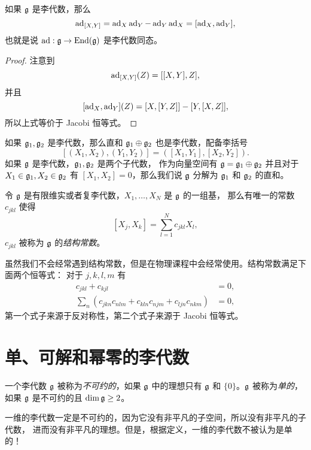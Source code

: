 \begin{proposition}
  如果 $\mathfrak{g}$ 是李代数，那么
  \[
    \operatorname{ad}_{[X,Y]}=\operatorname{ad}_X\operatorname{ad}_Y-\operatorname{ad}_Y\operatorname{ad}_X=[\operatorname{ad}_X,\operatorname{ad}_Y],
  \]
  也就是说 $\operatorname{ad}:\mathfrak{g}\to\operatorname{End}(\mathfrak{g})$ 是李代数同态。
\end{proposition}
\begin{proof}
  注意到
  \[
    \operatorname{ad}_{[X,Y]}(Z)=[[X,Y],Z],
  \]
  并且
  \[
    [\operatorname{ad}_X,\operatorname{ad}_Y](Z)=[X,[Y,Z]]-[Y,[X,Z]],
  \]
  所以上式等价于 Jacobi 恒等式。
\end{proof}

\begin{definition}
  如果 $\mathfrak{g}_1,\mathfrak{g}_2$ 是李代数，那么直和 $\mathfrak{g}_1\oplus\mathfrak{g}_2$
  也是李代数，配备李括号
  \[
    [(X_1,X_2),(Y_1,Y_2)]=([X_1,Y_1],[X_2,Y_2]).
  \]
  如果 $\mathfrak{g}$ 是李代数，$\mathfrak{g}_1,\mathfrak{g}_2$ 是两个子代数，
  作为向量空间有 $\mathfrak{g}=\mathfrak{g}_1\oplus\mathfrak{g}_2$ 并且对于 $X_1\in\mathfrak{g}_1,X_2\in\mathfrak{g}_2$
  有 $[X_1,X_2]=0$，那么我们说 $\mathfrak{g}$ 分解为 $\mathfrak{g}_1$ 和 $\mathfrak{g}_2$
  的直和。
\end{definition}

\begin{definition}
  令 $\mathfrak{g}$ 是有限维实或者复李代数，$X_1,\dots,X_N$ 是 $\mathfrak{g}$ 的一组基，
  那么有唯一的常数 $c_{jkl}$ 使得 
  \[
    [X_j,X_k]=\sum_{l=1}^N c_{jkl}X_l,
  \]
  $c_{jkl}$ 被称为 $\mathfrak{g}$ 的\emph{结构常数}。
\end{definition}

虽然我们不会经常遇到结构常数，但是在物理课程中会经常使用。结构常数满足下面两个恒等式：
对于 $j,k,l,m$ 有 
\begin{align*}
  c_{jkl}+c_{kjl}&=0,\\
  \sum_n (c_{jkn}c_{nlm}+c_{kln}c_{njm}+c_{ljn}c_{nkm})&=0,
\end{align*}
第一个式子来源于反对称性，第二个式子来源于 Jacobi 恒等式。

\section{单、可解和幂零的李代数}

\begin{definition}
  一个李代数 $\mathfrak{g}$ 被称为\emph{不可约的}，如果 $\mathfrak{g}$ 中的理想只有
  $\mathfrak{g}$ 和 $\{0\}$。$\mathfrak{g}$ 被称为\emph{单的}，如果 $\mathfrak{g}$
  是不可约的且 $\dim \mathfrak{g}\geq 2$。
\end{definition}

一维的李代数一定是不可约的，因为它没有非平凡的子空间，所以没有非平凡的子代数，
进而没有非平凡的理想。但是，根据定义，一维的李代数不被认为是单的！

